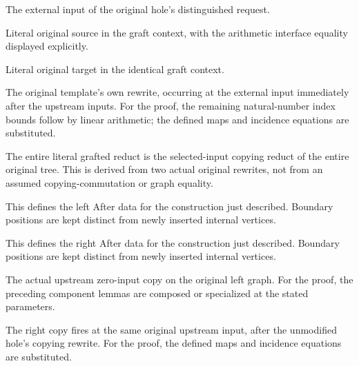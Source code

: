The external input of the original hole's distinguished request.
\par{}

Literal original source in the graft context, with the arithmetic interface equality displayed explicitly.
\par{}

Literal original target in the identical graft context.
\par{}

The original template's own rewrite, occurring at the external input immediately after the upstream inputs.
For the proof, the remaining natural-number index bounds follow by linear arithmetic; the defined maps and incidence equations are substituted.
\par{}

The entire literal grafted reduct is the selected-input copying reduct of the entire original tree. This is derived from two actual original rewrites, not from an assumed copying-commutation or graph equality.
\par{}

This defines the left After data for the construction just described. Boundary positions are kept distinct from newly inserted internal vertices.
\par{}

This defines the right After data for the construction just described. Boundary positions are kept distinct from newly inserted internal vertices.
\par{}

The actual upstream zero-input copy on the original left graph.
For the proof, the preceding component lemmas are composed or specialized at the stated parameters.
\par{}

The right copy fires at the same original upstream input, after the unmodified hole's copying rewrite.
For the proof, the defined maps and incidence equations are substituted.
\par{}

